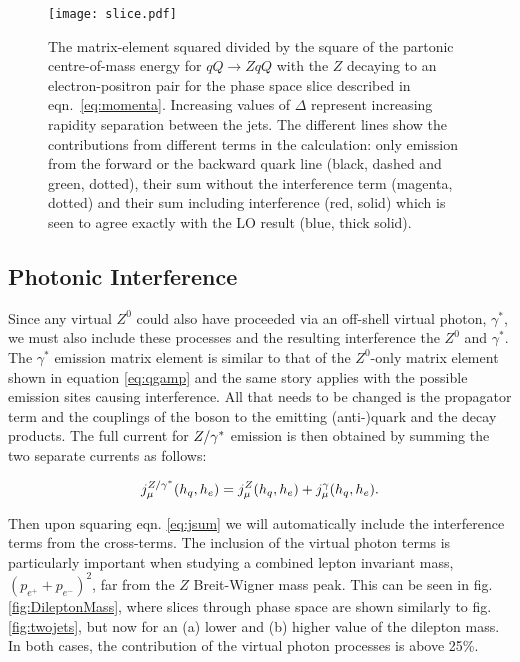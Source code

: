 		\begin{figure}[hbt]
		  \begin{center}
		    \texttt{[image: slice.pdf]}
		    \caption{The matrix-element squared divided by the square of the partonic
		      centre-of-mass energy for $qQ\to ZqQ$ with the $Z$ decaying to an
		      electron-positron pair for the phase space slice described in
		      eqn.~\eqref{eq:momenta}.  Increasing values of $\Delta$ represent
		      increasing rapidity separation between the jets.  The different lines show the contributions from
		      different terms in the calculation: only emission from the forward or the
		      backward quark line (black, dashed and green, dotted), their sum without
		      the interference term (magenta, dotted) and their sum including
		      interference (red, solid) which is seen to agree exactly with the LO result
		      (blue, thick solid).}
		    \label{fig:twojets}
		  \end{center}
		\end{figure}

	\subsection{Photonic Interference}

		Since any virtual $Z^0$ could also have proceeded via an off-shell virtual photon,
		$\gamma^*$, we must also include these processes and the resulting interference the
		$Z^0$ and $\gamma^*$.\\
		The $\gamma^*$ emission matrix element is similar to that of the $Z^0$-only matrix
		element shown in equation \eqref{eq:qgamp} and the same story applies with the
		possible emission sites causing interference.  All that needs to be changed is the
		propagator term and the couplings of the boson to the emitting (anti-)quark and
		the decay products.  The full current for $Z/\gamma^*$ emission is then obtained by summing
		the two separate currents as follows:

		\begin{align}
			\label{eq:jsum}
			j^{Z/\gamma^*}_\mu(h_q,h_e) = j^Z_\mu(h_q,h_e) + j^\gamma_\mu(h_q,h_e).
		\end{align}

		Then upon squaring eqn. \eqref{eq:jsum} we will automatically include the interference
		terms from the cross-terms. The inclusion of the virtual photon terms is particularly
		important when studying a combined lepton invariant mass, $(p_{e^+} + p_{e^-})^2$,
		far from the $Z$ Breit-Wigner mass peak. This can be seen in fig. \eqref{fig:DileptonMass},
		where slices through phase space are shown similarly to fig. \eqref{fig:twojets}, but
		now for an (a) lower and (b) higher value of the dilepton mass.  In both cases, the
		contribution of the virtual photon processes is above 25\%.

